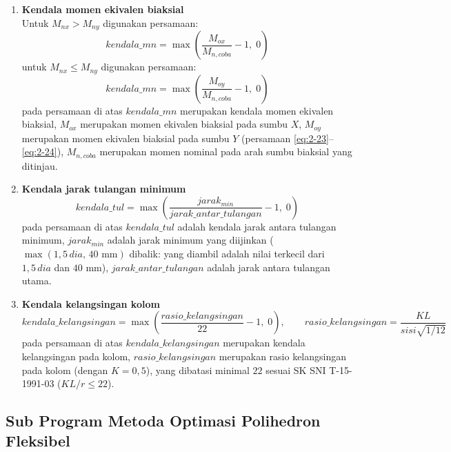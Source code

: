 \begin{enumerate}[label=\arabic*.]
\item \textbf{Kendala momen ekivalen biaksial}\\
Untuk $M_{nx} > M_{ny}$ digunakan persamaan:
\begin{equation}
\mathit{kendala\_mn} = \max\!\left(\frac{M_{ox}}{M_{n,coba}} - 1,\; 0\right)
\label{eq:3-11a}
\end{equation}
untuk $M_{nx} \le M_{ny}$ digunakan persamaan:
\begin{equation}
\mathit{kendala\_mn} = \max\!\left(\frac{M_{oy}}{M_{n,coba}} - 1,\; 0\right)
\label{eq:3-11b}
\end{equation}
pada persamaan di atas $\mathit{kendala\_mn}$ merupakan kendala momen
ekivalen biaksial, $M_{ox}$ merupakan momen ekivalen biaksial pada sumbu
$X$, $M_{oy}$ merupakan momen ekivalen biaksial pada sumbu $Y$ (persamaan
\eqref{eq:2-23}--\eqref{eq:2-24}), $M_{n,coba}$ merupakan momen nominal
pada arah sumbu biaksial yang ditinjau.

\item \textbf{Kendala jarak tulangan minimum}
\begin{equation}
\mathit{kendala\_tul} = \max\!\left(\frac{jarak_{min}}{\mathit{jarak\_antar\_tulangan}} - 1,\; 0\right)
\label{eq:3-12}
\end{equation}
pada persamaan di atas $\mathit{kendala\_tul}$ adalah kendala jarak antara
tulangan minimum, $jarak_{min}$ adalah jarak minimum yang diijinkan
($\max(1{,}5\,dia,\,40\text{ mm})$ dibalik: yang diambil adalah nilai
terkecil dari $1{,}5\,dia$ dan $40$ mm), $\mathit{jarak\_antar\_tulangan}$
adalah jarak antara tulangan utama.

\item \textbf{Kendala kelangsingan kolom}
\begin{equation}
\mathit{kendala\_kelangsingan} = \max\!\left(\frac{\mathit{rasio\_kelangsingan}}{22} - 1,\; 0\right),
\qquad \mathit{rasio\_kelangsingan} = \frac{K L}{\mathit{sisi}\sqrt{1/12}}
\label{eq:3-13}
\end{equation}
pada persamaan di atas $\mathit{kendala\_kelangsingan}$ merupakan kendala
kelangsingan pada kolom, $\mathit{rasio\_kelangsingan}$ merupakan rasio
kelangsingan pada kolom (dengan $K=0{,}5$), yang dibatasi minimal $22$
sesuai SK SNI T-15-1991-03 ($KL/r \le 22$).
\end{enumerate}

\subsection{Sub Program Metoda Optimasi Polihedron Fleksibel}

